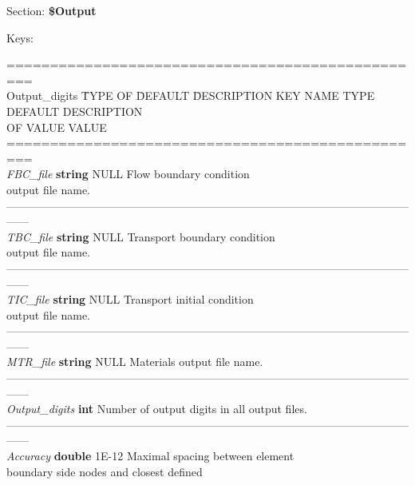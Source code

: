 \documentclass[a4paper]{article}
\begin{document}
\begin{flushleft}
Section: \textbf{\$Output}

Keys:
\end{flushleft}
\vspace{-20pt}
\small
\begin{tabbing}
=================================================\\
Output\_digits	\quad 	\= TYPE OF \quad \= DEFAULT	\quad 	\=DESCRIPTION\kill
KEY NAME	 			 				\> TYPE		 				\> DEFAULT	 				\>DESCRIPTION\\
												\> OF VALUE				\> VALUE						\>\\
=================================================\\
\textit{FBC\_file} 	\> \textbf{string}	\> NULL		\>Flow boundary condition\\
										\> 									\> 				\>output file name.\\
------------------------------------------------------------------------------------------------------------------\\
\textit{TBC\_file} 	\> \textbf{string} 	\> NULL		\>Transport boundary condition\\
										\> 									\> 				\>output file name.\\
------------------------------------------------------------------------------------------------------------------\\
\textit{TIC\_file}	\> \textbf{string}	\> NULL		\>Transport initial condition\\
										\> 									\> 				\>output file name.\\
------------------------------------------------------------------------------------------------------------------\\
\textit{MTR\_file}	\> \textbf{string}	\> NULL		\>Materials output file name.\\
------------------------------------------------------------------------------------------------------------------\\
\textit{Output\_digits}	\> \textbf{int}				\>Number of output digits in all output files.\\
------------------------------------------------------------------------------------------------------------------\\
\textit{Accuracy}		\> \textbf{double}	\> 1E-12	\>Maximal spacing between element\\ 
										\> 									\> 				\>boundary side nodes and closest defined\\ 

\end{tabbing}
\end{document}
